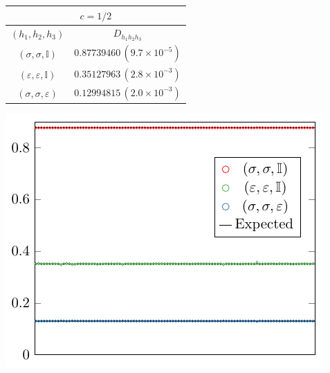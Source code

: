 \documentclass[a4paper,11pt]{article}
\begin{document}
\begin{table}[tbp]
\begin{minipage}{0.5\linewidth}
\centering
\begin{tabular}{|c|c|}
\multicolumn{2}{c}{$c=1/2$}\\
\hline 
  $(h_1, h_2, h_3)$ &  $D_{h_1 h_2 h_3}$ \\ 
 \hline
 $(\sigma, \sigma, \mathbb{I})$ & $0.87739460\, (9.7\times 10^{-5})$         \\
 $(\varepsilon, \varepsilon, \mathbb{I})$ & $0.35127963\, (2.8\times 10^{-3})$        \\
 $(\sigma, \sigma, \varepsilon)$   & $0.12994815\, (2.0\times 10^{-3})$  \\
 \hline
\end{tabular}
\end{minipage}
\begin{minipage}{0.5\linewidth}
\centering
\includegraphics[width=\textwidth]{bootstrap_ising_3.pdf}
\end{minipage}
\vspace{0.75cm}


\end{table}
\end{document}
